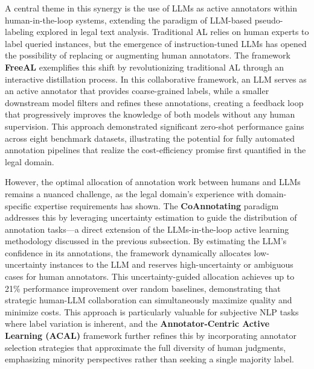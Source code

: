 \documentclass[11pt]{article}
\begin{document}
A central theme in this synergy is the use of LLMs as active annotators within human-in-the-loop systems, extending the paradigm of LLM-based pseudo-labeling explored in legal text analysis. Traditional AL relies on human experts to label queried instances, but the emergence of instruction-tuned LLMs has opened the possibility of replacing or augmenting human annotators. The framework \textbf{FreeAL} \cite{ref582} exemplifies this shift by revolutionizing traditional AL through an interactive distillation process. In this collaborative framework, an LLM serves as an active annotator that provides coarse-grained labels, while a smaller downstream model filters and refines these annotations, creating a feedback loop that progressively improves the knowledge of both models without any human supervision. This approach demonstrated significant zero-shot performance gains across eight benchmark datasets, illustrating the potential for fully automated annotation pipelines that realize the cost-efficiency promise first quantified in the legal domain.

However, the optimal allocation of annotation work between humans and LLMs remains a nuanced challenge, as the legal domain's experience with domain-specific expertise requirements has shown. The \textbf{CoAnnotating} paradigm \cite{ref577} addresses this by leveraging uncertainty estimation to guide the distribution of annotation tasks---a direct extension of the LLMs-in-the-loop active learning methodology discussed in the previous subsection. By estimating the LLM's confidence in its annotations, the framework dynamically allocates low-uncertainty instances to the LLM and reserves high-uncertainty or ambiguous cases for human annotators. This uncertainty-guided allocation achieves up to 21\% performance improvement over random baselines, demonstrating that strategic human-LLM collaboration can simultaneously maximize quality and minimize costs. This approach is particularly valuable for subjective NLP tasks where label variation is inherent, and the \textbf{Annotator-Centric Active Learning (ACAL)} framework \cite{ref583} further refines this by incorporating annotator selection strategies that approximate the full diversity of human judgments, emphasizing minority perspectives rather than seeking a single majority label.
\end{document}

